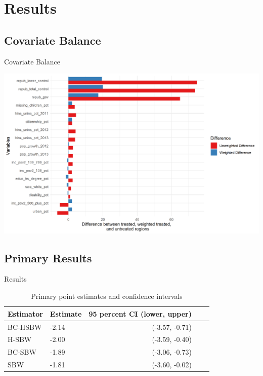 \documentclass[hyperref={pdfpagelabels=false}]{beamer}
\begin{document}
\section{Results}

\subsection{Covariate Balance}

\begin{frame}{Covariate Balance}
    \begin{center}
	\includegraphics[scale=0.5]{01_Plots/balance-plot-etu.png}
    \end{center}
\end{frame}

\subsection{Primary Results}

\begin{frame}{Results}

\begin{table}[ht]
\begin{tabular}{llrll}
  \toprule
Estimator & Estimate & 95 percent CI (lower, upper)\\ 
  \midrule
  BC-HSBW & -2.14 & (-3.57, -0.71) \\ 
  H-SBW & -2.00 & (-3.59, -0.40) \\ 
  BC-SBW & -1.89 & (-3.06, -0.73) \\ 
  SBW & -1.81 & (-3.60, -0.02) \\ 
   \bottomrule
\end{tabular}
\caption{Primary point estimates and confidence intervals}
\label{tab:confintmain}
\end{table}

\end{frame}
\end{document}
